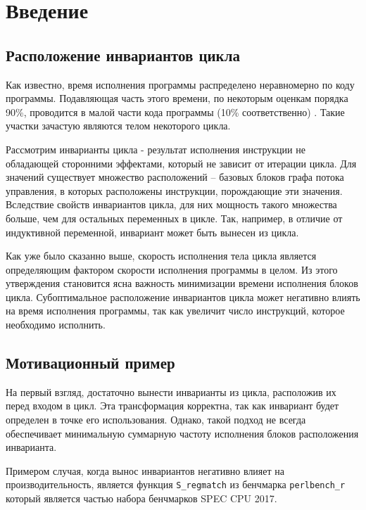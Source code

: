 \chapter*{Введение}

\section*{Расположение инвариантов цикла}

Как известно, время исполнения программы распределено неравномерно по коду программы.
Подавляющая часть этого времени, по некоторым оценкам порядка 90\%, проводится в малой части кода программы (10\% соответственно) \cite{Aho_Ullman_focs}.
Такие участки зачастую являются телом некоторого цикла.

Рассмотрим инварианты цикла - результат исполнения инструкции не обладающей сторонними эффектами, который не зависит от итерации цикла.
Для значений существует множество расположений -- базовых блоков графа потока управления, в которых расположены инструкции, порождающие эти значения.
Вследствие свойств инвариантов цикла, для них мощность такого множества больше, чем для остальных переменных в цикле.
Так, например, в отличие от индуктивной переменной, инвариант может быть вынесен из цикла.

Как уже было сказанно выше, скорость исполнения тела цикла является определяющим фактором скорости исполнения программы в целом.
Из этого утверждения становится ясна важность минимизации времени исполнения блоков цикла.
Субоптимальное расположение инвариантов цикла может негативно влиять на время исполнения программы, так как увеличит число инструкций, которое необходимо исполнить.

\section*{Мотивационный пример}

На первый взгляд, достаточно вынести инварианты из цикла, расположив их перед входом в цикл.
Эта трансформация корректна, так как инвариант будет определен в точке его использования.
Однако, такой подход не всегда обеспечивает минимальную суммарную частоту исполнения блоков расположения инварианта.

Примером случая, когда вынос инвариантов негативно влияет на производительность, является функция \texttt{S\_regmatch} из бенчмарка \texttt{perlbench\_r} который является частью набора бенчмарков SPEC CPU\textsuperscript{\tiny\textregistered} 2017.

